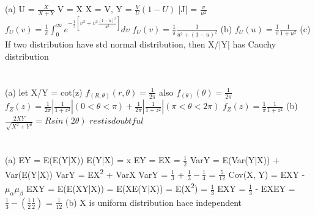 \documentclass{report}
\begin{document}
\section{}
(a) U = $\frac{X}{X + Y}$
\newline
V = X
\newline
X = V, Y = $\frac{V}{U}(1-U)$
\newline
|J| = $\frac{v}{u^2}$
\newline
$f_U(v) = \frac{1}{\pi}\int_{0}^{\infty}e^{-\frac{1}{2}\left[v^2 + v^2\frac{[1 - u]^2}{u^2}\right]}dv$
\newline
$f_U(v) = \frac{1}{\pi} \frac{1}{u^2 + (1 - u)^2}$
\newline
(b) $f_U(u) = \frac{1}{\pi} \frac{1}{1 + u^2}$
\newline
(c) If two distribution have std normal distribution, then X/|Y| has Cauchy distribution
\newline
\section{}
(a) let X/Y = cot(z)
\newline
$f_(R, \theta)(r, \theta) = \frac{1}{2\pi}$
\newline
also
\newline
$f_(\theta)(\theta) = \frac{1}{2\pi}$
\newline
$f_Z(z) = \frac{1}{2\pi}\left|\frac{1}{1 + z^2}\right| (0 < \theta < \pi) + \frac{1}{2\pi}\left|\frac{1}{1 + z^2}\right| (\pi < \theta < 2\pi)$
\newline
$f_Z(z) = \frac{1}{\pi}\frac{1}{1 + z^2}$
\newline
(b)	$\frac{2XY}{\sqrt{X^2 + Y^2}} = Rsin(2\theta)$
\newline
$rest is doubtful$
\section{}
(a) EY = E(E(Y|X))
\newline
E(Y|X) = x
EY = EX = $\frac{1}{2}$
\newline
VarY = E(Var(Y|X)) + Var(E(Y|X))
\newline
VarY = EX{\textsuperscript{2}} + VarX
\newline
VarY = $\frac{1}{3}$ + $\frac{1}{3} - \frac{1}{4}$ = $\frac{5}{12}$
\newline
Cov(X, Y) = EXY - $\mu_{\alpha}\mu_{\beta}$
\newline
EXY = E(E(XY|X)) = E(XE(Y|X)) = E(X\textsuperscript{2}) = $\frac{1}{3}$
EXY = $\frac{1}{3}$ - EXEY = $\frac{1}{3} - (\frac{1}{2}\frac{1}{2})$ = $\frac{1}{12}$
\newline
(b) X is uniform distribution hace independent
\newline
\end{document}
